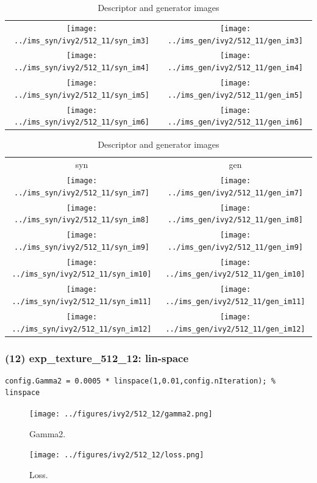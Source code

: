 \documentclass[letter]{article}
\begin{document}
\begin{table}[h!]
\begin{tabular}{cc}
		\texttt{[image: ../ims\_syn/ivy2/512\_11/syn\_im3]} & \texttt{[image: ../ims\_gen/ivy2/512\_11/gen\_im3]} \tabularnewline
		\texttt{[image: ../ims\_syn/ivy2/512\_11/syn\_im4]} & \texttt{[image: ../ims\_gen/ivy2/512\_11/gen\_im4]} \tabularnewline
		\texttt{[image: ../ims\_syn/ivy2/512\_11/syn\_im5]} & \texttt{[image: ../ims\_gen/ivy2/512\_11/gen\_im5]} \tabularnewline
		\texttt{[image: ../ims\_syn/ivy2/512\_11/syn\_im6]} & \texttt{[image: ../ims\_gen/ivy2/512\_11/gen\_im6]} \tabularnewline
	\end{tabular}
	\begin{tabular}{cc}
		syn & gen\tabularnewline
		\texttt{[image: ../ims\_syn/ivy2/512\_11/syn\_im7]} & \texttt{[image: ../ims\_gen/ivy2/512\_11/gen\_im7]} \tabularnewline
		\texttt{[image: ../ims\_syn/ivy2/512\_11/syn\_im8]} & \texttt{[image: ../ims\_gen/ivy2/512\_11/gen\_im8]} \tabularnewline
		\texttt{[image: ../ims\_syn/ivy2/512\_11/syn\_im9]} & \texttt{[image: ../ims\_gen/ivy2/512\_11/gen\_im9]} \tabularnewline
		\texttt{[image: ../ims\_syn/ivy2/512\_11/syn\_im10]} & \texttt{[image: ../ims\_gen/ivy2/512\_11/gen\_im10]} \tabularnewline
		\texttt{[image: ../ims\_syn/ivy2/512\_11/syn\_im11]} & \texttt{[image: ../ims\_gen/ivy2/512\_11/gen\_im11]} \tabularnewline
		\texttt{[image: ../ims\_syn/ivy2/512\_11/syn\_im12]} & \texttt{[image: ../ims\_gen/ivy2/512\_11/gen\_im12]} \tabularnewline
	\end{tabular}
	\caption{Descriptor and generator images}
\end{table}
\newpage

\subsubsection*{(12) exp\_texture\_512\_12: lin-space}

\begin{lstlisting}
config.Gamma2 = 0.0005 * linspace(1,0.01,config.nIteration); % linspace
\end{lstlisting}

\begin{figure}[h!]
	\centering
	\texttt{[image: ../figures/ivy2/512\_12/gamma2.png]}
	\caption{\label{fig:gamma1}Gamma2.}
\end{figure}

\begin{figure}[h!]
	\centering
	\texttt{[image: ../figures/ivy2/512\_12/loss.png]}
	\caption{\label{fig:gamma1}Loss.}
\end{figure}

\newpage
\end{document}
